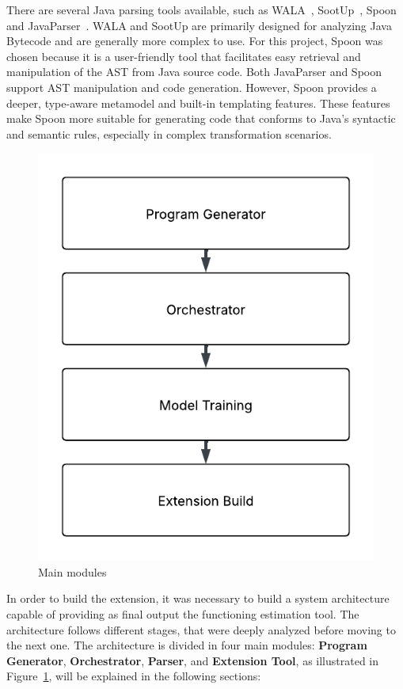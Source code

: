 There are several Java parsing tools available, such as WALA~\cite{wala_main}, SootUp~\cite{sootup_main}, Spoon~\cite{spoon_main} and JavaParser~\cite{javaParser}. WALA and SootUp are primarily designed for analyzing Java Bytecode and are generally more complex to use. For this project, Spoon was chosen because it is a user-friendly tool that facilitates easy retrieval and manipulation of the AST from Java source code. Both JavaParser and Spoon support AST manipulation and code generation. However, Spoon provides a deeper, type-aware metamodel and built-in templating features. These features make Spoon more suitable for generating code that conforms to Java’s syntactic and semantic rules, especially in complex transformation scenarios.


\begin{figure}[htbp]
  \centering
  \includegraphics[scale=0.7]{figures/main_modules.pdf}
  \caption{Main modules}
  \label{fig:main_modules}
\end{figure}




In order to build the extension, it was necessary to build a system architecture capable of providing as final output the functioning estimation tool. The architecture follows different stages, that were deeply analyzed before moving to the next one.
The architecture is divided in four main modules: \textbf{Program Generator}, \textbf{Orchestrator}, \textbf{Parser}, and \textbf{Extension Tool}, as illustrated in Figure~\ref{fig:main_modules}, will be explained in the following sections:



